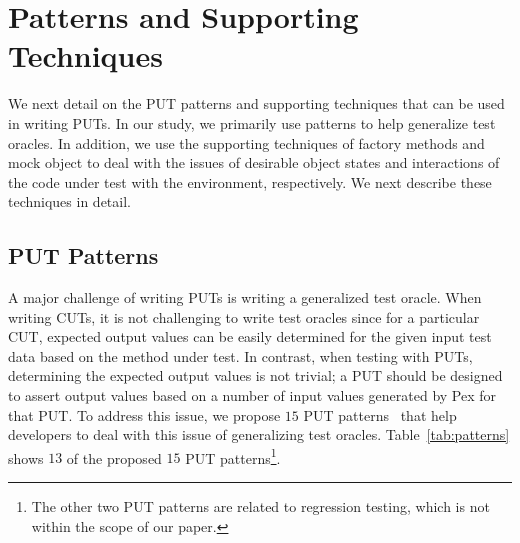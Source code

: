 \section{Patterns and Supporting Techniques}
\label{sec:helper}

We next detail on the PUT patterns and supporting techniques that can be used in writing PUTs. In our study, we primarily use patterns to help generalize test oracles. In addition, we use the supporting techniques of factory methods and mock object to deal with the issues of desirable object states and interactions of the code under test with the environment, respectively. We next describe these techniques in detail.

\subsection{PUT Patterns}
\label{sec:patterns}

A major challenge of writing PUTs is writing a generalized test oracle. When writing CUTs, it is not challenging to write test oracles since for a particular CUT, expected output values can be easily determined for the given input test data based on the method under test. In contrast, when testing with PUTs, determining the expected output values is not trivial; a PUT should be designed to assert output values based on a number of input values generated by Pex for that PUT. To address this issue, we propose $15$ PUT patterns~\cite{halleux08:putpatterns} that help developers to deal with this issue of generalizing test oracles. Table~\ref{tab:patterns} shows $13$ of the proposed $15$ PUT patterns\footnote{The other two PUT patterns are related to regression testing, which is not within the scope of our paper.}.

